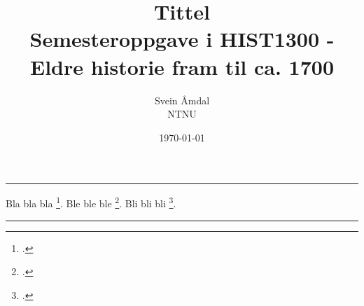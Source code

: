 \documentclass[12pt, a4paper, norsk]{article}
\title{\huge{\textbf{Tittel}}\\ \large{Semesteroppgave i HIST1300 - Eldre historie fram til ca. 1700}}
\author{\huge{Svein Åmdal} \\ \large{NTNU}}
\date{\today} %
\begin{document}
\maketitle
\hrule
\vspace{1cm}
\clearpage
\setcounter{page}{1}

Bla bla bla \footcite{Pounds}. Ble ble ble \footcite[27--30]{Ødegård}. Bli bli bli \footcites[4,22-23,45]{Wiesner-Hanks}[20]{Ødegård}.


% 

\lipsum[1-2]





\vspace{1cm}
\hrule
\printbibliography[title=Litteratur]
\end{document}
